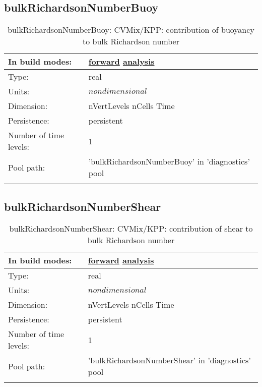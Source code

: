 \subsection[bulkRichardsonNumberBuoy]{bulkRichardsonNumberBuoy}
\label{subsec:var_sec_diagnostics_bulkRichardsonNumberBuoy}
\begin{center}
\begin{longtable}{| p{2.0in} | p{4.0in} |}
        \hline 
        In build modes: & \hyperref[subsec:forward_var_tab_diagnostics]{forward} \hyperref[subsec:analysis_var_tab_diagnostics]{analysis} \\
        \hline 
        Type: & real \\
        \hline 
        Units: & $nondimensional$ \\
        \hline 
        Dimension: & nVertLevels nCells Time \\
        \hline 
        Persistence: & persistent \\
        \hline 
        Number of time levels: & 1 \\
        \hline 
            Pool path: & 'bulkRichardsonNumberBuoy' in 'diagnostics' pool
 \\
		 \hline 
    \caption{bulkRichardsonNumberBuoy: CVMix/KPP: contribution of buoyancy to bulk Richardson number}
\end{longtable}
\end{center}
\subsection[bulkRichardsonNumberShear]{bulkRichardsonNumberShear}
\label{subsec:var_sec_diagnostics_bulkRichardsonNumberShear}
\begin{center}
\begin{longtable}{| p{2.0in} | p{4.0in} |}
        \hline 
        In build modes: & \hyperref[subsec:forward_var_tab_diagnostics]{forward} \hyperref[subsec:analysis_var_tab_diagnostics]{analysis} \\
        \hline 
        Type: & real \\
        \hline 
        Units: & $nondimensional$ \\
        \hline 
        Dimension: & nVertLevels nCells Time \\
        \hline 
        Persistence: & persistent \\
        \hline 
        Number of time levels: & 1 \\
        \hline 
            Pool path: & 'bulkRichardsonNumberShear' in 'diagnostics' pool
 \\
		 \hline 
    \caption{bulkRichardsonNumberShear: CVMix/KPP: contribution of shear to bulk Richardson number}
\end{longtable}
\end{center}
